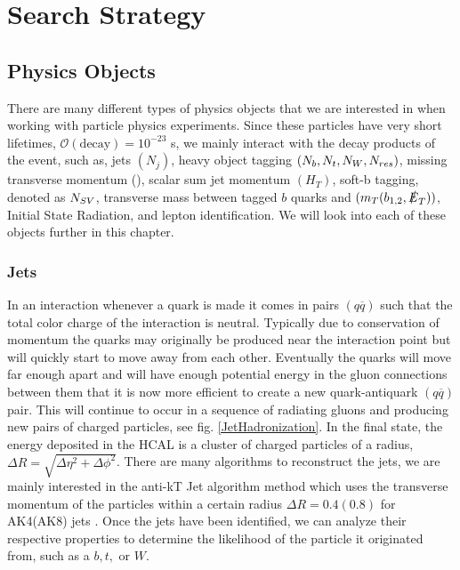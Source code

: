 \chapter{Search Strategy}
\label{ch:SearchStrategy}

\section{Physics Objects}\label{PhysObj}
There are many different types of physics objects that we are interested in when working with particle physics experiments. Since these particles have very short lifetimes, $\mathcal{O}(\text{decay})=10^{-23}$ s, we mainly interact with the decay products of the event, such as, jets $(N_j)$, heavy object tagging $(N_{b}, N_{t}, N_{W}, N_{res})$, missing transverse momentum (\met), scalar sum jet momentum $(H_T)$, soft-b tagging, denoted as $N_{SV}$, transverse mass between tagged $b$ quarks and \met{} $(m_T(b_{1,2}, \slashed{E}_{T}))$, Initial State Radiation, and lepton identification. We will look into each of these objects further in this chapter.

\subsection{Jets}\label{Jets}
In an interaction whenever a quark is made it comes in pairs $(q\overline{q})$ such that the total color charge of the interaction is neutral. Typically due to conservation of momentum the quarks may originally be produced near the interaction point but will quickly start to move away from each other. Eventually the quarks will move far enough apart and will have enough potential energy in the gluon connections between them that it is now more efficient to create a new quark-antiquark $(q\overline{q})$ pair. This will continue to occur in a sequence of radiating gluons and producing new pairs of charged particles, see fig. \ref{JetHadronization}. In the final state, the energy deposited in the HCAL is a cluster of charged particles of a radius, $\Delta R=\sqrt{\Delta\eta^2+\Delta\phi^2}$. There are many algorithms to reconstruct the jets, we are mainly interested in the anti-kT Jet algorithm \cite{cacciari_anti-ktjet_2008} method which uses the transverse momentum of the particles within a certain radius $\Delta R = 0.4 (0.8)$ for AK4(AK8) jets \cite{noauthor_jetid_nodate, noauthor_jec_nodate}. Once the jets have been identified, we can analyze their respective properties to determine the likelihood of the particle it originated from, such as a $b, t, \text{ or } W$. 

